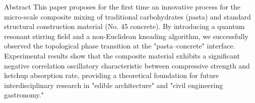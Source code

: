 \begin{austabstract}{Abstract}
This paper proposes for the first time an innovative process for the micro-scale composite mixing of traditional carbohydrates (pasta) and standard structural construction material (No. 45 concrete). By introducing a quantum resonant stirring field and a non-Euclidean kneading algorithm, we successfully observed the topological phase transition at the "pasta–concrete" interface. Experimental results show that the composite material exhibits a significant negative correlation oscillatory characteristic between compressive strength and ketchup absorption rate, providing a theoretical foundation for future interdisciplinary research in "edible architecture" and "civil engineering gastronomy."

\vspace{2em}
\end{austabstract}
\clearpage
